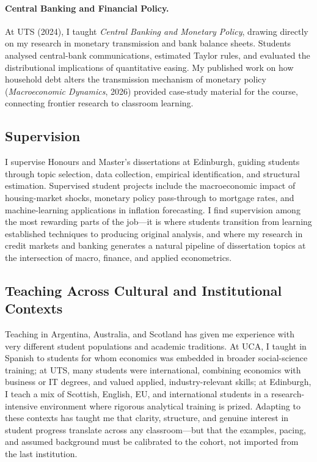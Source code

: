 \documentclass[12pt,a4paper]{article}
\begin{document}
\paragraph{Central Banking and Financial Policy.} At UTS (2024), I taught \textit{Central Banking and Monetary Policy}, drawing directly on my research in monetary transmission and bank balance sheets. Students analysed central-bank communications, estimated Taylor rules, and evaluated the distributional implications of quantitative easing. My published work on how household debt alters the transmission mechanism of monetary policy (\textit{Macroeconomic Dynamics}, 2026) provided case-study material for the course, connecting frontier research to classroom learning.

\subsection*{Supervision}
\vspace{-0.3cm}

I supervise Honours and Master's dissertations at Edinburgh, guiding students through topic selection, data collection, empirical identification, and structural estimation. Supervised student projects include the macroeconomic impact of housing-market shocks, monetary policy pass-through to mortgage rates, and machine-learning applications in inflation forecasting. I find supervision among the most rewarding parts of the job---it is where students transition from learning established techniques to producing original analysis, and where my research in credit markets and banking generates a natural pipeline of dissertation topics at the intersection of macro, finance, and applied econometrics.

\subsection*{Teaching Across Cultural and Institutional Contexts}
\vspace{-0.3cm}

Teaching in Argentina, Australia, and Scotland has given me experience with very different student populations and academic traditions. At UCA, I taught in Spanish to students for whom economics was embedded in broader social-science training; at UTS, many students were international, combining economics with business or IT degrees, and valued applied, industry-relevant skills; at Edinburgh, I teach a mix of Scottish, English, EU, and international students in a research-intensive environment where rigorous analytical training is prized. Adapting to these contexts has taught me that clarity, structure, and genuine interest in student progress translate across any classroom---but that the examples, pacing, and assumed background must be calibrated to the cohort, not imported from the last institution.
\end{document}
